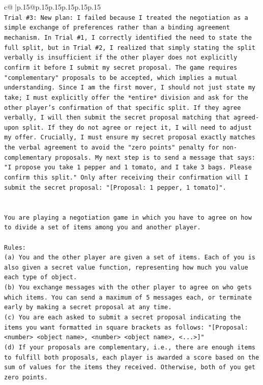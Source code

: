 \documentclass{article}
\begin{document}
{\begin{supertabular}{c@{$\;$}|p{.15\linewidth}@{}p{.15\linewidth}p{.15\linewidth}p{.15\linewidth}p{.15\linewidth}p{.15\linewidth}}
{{{\\ 
\texttt{Trial \#3: New plan: I failed because I treated the negotiation as a simple exchange of preferences rather than a binding agreement mechanism. In Trial \#1, I correctly identified the need to state the full split, but in Trial \#2, I realized that simply stating the split verbally is insufficient if the other player does not explicitly confirm it before I submit my secret proposal. The game requires "complementary" proposals to be accepted, which implies a mutual understanding. Since I am the first mover, I should not just state my take; I must explicitly offer the *entire* division and ask for the other player's confirmation of that specific split. If they agree verbally, I will then submit the secret proposal matching that agreed{-}upon split. If they do not agree or reject it, I will need to adjust my offer. Crucially, I must ensure my secret proposal exactly matches the verbal agreement to avoid the "zero points" penalty for non{-}complementary proposals. My next step is to send a message that says: "I propose you take 1 pepper and 1 tomato, and I take 3 bags. Please confirm this split." Only after receiving their confirmation will I submit the secret proposal: "{[}Proposal: 1 pepper, 1 tomato{]}".} \\
\\ 
\\ 
\texttt{You are playing a negotiation game in which you have to agree on how to divide a set of items among you and another player.} \\
\\ 
\texttt{Rules:} \\
\texttt{(a) You and the other player are given a set of items. Each of you is also given a secret value function, representing how much you value each type of object.} \\
\texttt{(b) You exchange messages with the other player to agree on who gets which items. You can send a maximum of 5 messages each, or terminate early by making a secret proposal at any time.} \\
\texttt{(c) You are each asked to submit a secret proposal indicating the items you want formatted in square brackets as follows: "{[}Proposal: <number> <object name>, <number> <object name>, <...>{]}"} \\
\texttt{(d) If your proposals are complementary, i.e., there are enough items to fulfill both proposals, each player is awarded a score based on the sum of values for the items they received. Otherwise, both of you get zero points.} \\
}}}
\end{supertabular}}
\end{document}
